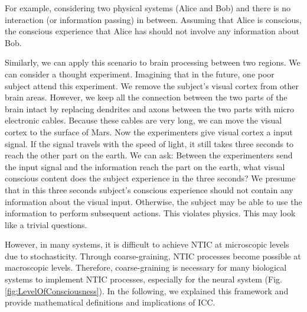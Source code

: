         \begin{WritingMaterials}
        For example, considering two physical systems (Alice and Bob) and there is no interaction (or information passing) in between. Assuming that Alice is conscious, the conscious experience that Alice has should not involve any information about Bob. 
        
        Similarly, we can apply this scenario to brain processing between two regions. We can consider a thought experiment. 
        Imagining that in the future, one poor subject attend this experiment. We remove the subject's visual cortex from other brain areas. However, we keep all the connection between the two parts of the brain intact by replacing dendrites and axons between the two parts with micro electronic cables. Because these cables are very long, we can move the visual cortex to the surface of Mars. Now the experimenters give visual cortex a input signal. If the signal travels with the speed of light, it still takes three seconds to reach the other part on the earth. We can ask: Between the experimenters send the input signal and the information reach the part on the earth, what visual conscious content does the subject experience in the three seconds? We presume that in this three seconds subject's conscious experience should not contain any information about the visual input. Otherwise, the subject may be able to use the information to perform subsequent actions. This violates physics. This may look like a trivial questions.
        

        However, in many systems, it is difficult to achieve NTIC at microscopic levels due to stochasticity. Through coarse-graining, NTIC processes become possible at macroscopic levels. Therefore, coarse-graining is necessary for many biological systems to implement NTIC processes, especially for the neural system (Fig. \ref{fig:LevelOfConsciousness}). In the following, we explained this framework and provide mathematical definitions and implications of ICC.  
        \end{WritingMaterials}
        

